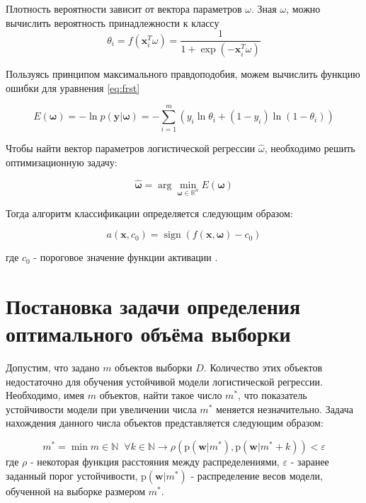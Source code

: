 \documentclass[12pt,twoside]{article}
\begin{document}
Плотность вероятности зависит от вектора параметров $\omega$. Зная $\omega$, можно вычислить вероятность принадлежности к классу 
\begin{equation}\label{eq:scnd}
\theta _ { i } = f \left( \mathbf { x } _ { i } ^ { T } \omega \right) = \frac { 1 } { 1 + \exp \left( - \mathbf { x } _ { i } ^ { T } \omega \right) }
\end{equation}

Пользуясь принципом максимального правдоподобия, можем вычислить функцию ошибки для уравнения \eqref{eq:frst}

\begin{equation}\label{eq:trd}
E ( \boldsymbol { \omega } ) = - \ln p ( \mathbf { y } | \boldsymbol { \omega } ) = - \sum _ { i = 1 } ^ { m } \left( y _ { i } \ln \theta _ { i } + \left( 1 - y _ { i } \right) \ln \left( 1 - \theta _ { i } \right) \right)
\end{equation}

Чтобы найти вектор параметров логистической регрессии $\widehat { \omega }$, необходимо решить оптимизационную задачу:

\begin{equation}\label{eq:frth}
\hat { \mathbf { \omega } } = \arg \min _ { \mathbf { \omega } \in \mathbb { R } ^ { n } } E ( \mathbf { \omega } )
\end{equation}

Тогда алгоритм классификации определяется следующим образом:

\begin{equation}\label{eq:fvth}
a \left( \mathbf { x } , c _ { 0 } \right) = \operatorname { sign } \left( f ( \mathbf { x } , \boldsymbol { \omega } ) - c _ { 0 } \right)
\end{equation}

где $c _ { 0 }$ - пороговое значение функции активации\cite{motrenko2014sample} .

\section{Постановка задачи определения оптимального объёма выборки}
Допустим, что задано $m$ объектов выборки $D$. Количество этих объектов недостаточно для обучения устойчивой модели логистической регрессии. Необходимо, имея $m$ объектов, найти такое число $m^ { * } $, что показатель устойчивости модели при увеличении числа $m^ { * } $ меняется незначительно. Задача нахождения данного числа объектов представляется следующим образом:

\begin{equation}\label{eq:sxth}
m ^ { * } = \min m \in \mathbb { N } \; \;  \forall  k \in \mathbb { N } \rightarrow \rho ( \mathrm { p } ( \boldsymbol { w } | m ^ {*} ) , \mathrm { p } ( \boldsymbol { w } | m ^ {*} + k ) ) < \varepsilon
\end{equation}
где $\rho$ - некоторая функция расстояния между распределениями, $\varepsilon$ - заранее заданный порог устойчивости, $\mathrm { p } ( \boldsymbol { w } | m ^ {*} )$
- распределение весов модели, обученной на выборке размером $m^{*}$.


\end{document}
